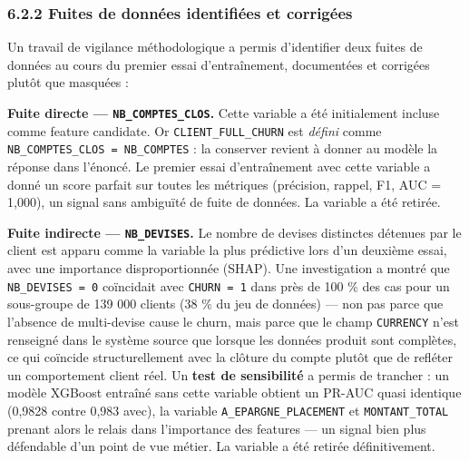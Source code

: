 \documentclass[11pt,a4paper]{article}
\begin{document}
\hypertarget{fuites-de-donnuxe9es-identifiuxe9es-et-corriguxe9es}{%
\subsubsection{6.2.2 Fuites de données identifiées et
corrigées}\label{fuites-de-donnuxe9es-identifiuxe9es-et-corriguxe9es}}

Un travail de vigilance méthodologique a permis d'identifier deux fuites
de données au cours du premier essai d'entraînement, documentées et
corrigées plutôt que masquées :

\textbf{Fuite directe ---
\texttt{NB\_\hspace{0pt}COMPTES\_\hspace{0pt}CLOS}.} Cette variable a
été initialement incluse comme feature candidate. Or
\texttt{CLIENT\_\hspace{0pt}FULL\_\hspace{0pt}CHURN} est \emph{défini}
comme
\texttt{NB\_\hspace{0pt}COMPTES\_\hspace{0pt}CLOS\ =\ NB\_\hspace{0pt}COMPTES}
: la conserver revient à donner au modèle la réponse dans l'énoncé. Le
premier essai d'entraînement avec cette variable a donné un score
parfait sur toutes les métriques (précision, rappel, F1, AUC = 1,000),
un signal sans ambiguïté de fuite de données. La variable a été retirée.

\textbf{Fuite indirecte --- \texttt{NB\_\hspace{0pt}DEVISES}.} Le nombre
de devises distinctes détenues par le client est apparu comme la
variable la plus prédictive lors d'un deuxième essai, avec une
importance disproportionnée (SHAP). Une investigation a montré que
\texttt{NB\_\hspace{0pt}DEVISES\ =\ 0} coïncidait avec
\texttt{CHURN\ =\ 1} dans près de 100 \% des cas pour un sous-groupe de
139 000 clients (38 \% du jeu de données) --- non pas parce que
l'absence de multi-devise cause le churn, mais parce que le champ
\texttt{CURRENCY} n'est renseigné dans le système source que lorsque les
données produit sont complètes, ce qui coïncide structurellement avec la
clôture du compte plutôt que de refléter un comportement client réel. Un
\textbf{test de sensibilité} a permis de trancher : un modèle XGBoost
entraîné sans cette variable obtient un PR-AUC quasi identique (0,9828
contre 0,983 avec), la variable
\texttt{A\_\hspace{0pt}EPARGNE\_\hspace{0pt}PLACEMENT} et
\texttt{MONTANT\_\hspace{0pt}TOTAL} prenant alors le relais dans
l'importance des features --- un signal bien plus défendable d'un point
de vue métier. La variable a été retirée définitivement.
\end{document}
